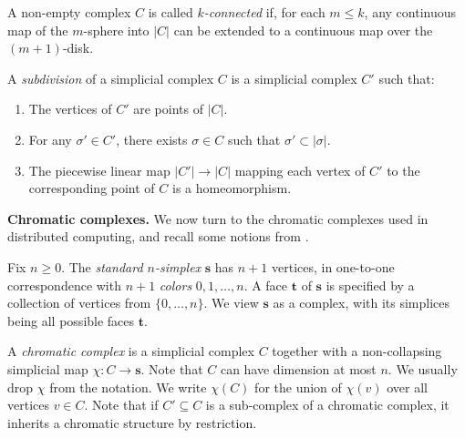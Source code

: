 \documentclass[a4paper]{article}
\newcommand{\myparagraph}[1]{\vspace{6pt}\noindent \textbf{#1}}
\def\s {\mathbf{s}}
\def\t {\mathbf{t}}
\def\Bary{\operatorname{Bary}}
\begin{document}

A non-empty complex $C$ is called {\em $k$-connected} if, for each $m\leq k$, any continuous map of the
$m$-sphere into $|C|$ can be extended to a continuous map over the $(m+1)$-disk.

A {\em subdivision} of a simplicial complex $C$ is a simplicial complex $C'$ such that:
\begin{enumerate}
\item The vertices of $C'$ are points of $|C|$.

\item For any $\sigma' \in C'$, there exists $\sigma \in C$ such that $\sigma' \subset |\sigma|$.

\item The piecewise linear map $|C'| \to |C|$ mapping each vertex of $C'$ to the corresponding point of $C$ is a
homeomorphism.
\end{enumerate}



\myparagraph{Chromatic complexes.}
%
We now turn to the chromatic complexes used in distributed computing, and recall some notions from \cite{HS99}.

Fix $n \geq 0$. The {\em standard $n$-simplex} $\s$ has $n+1$ vertices, in one-to-one correspondence with $n+1$
{\em colors} $0, 1, \dots, n$. A face $\t$ of $\s$ is specified by a collection of vertices from $\{0, \dots,
n\}$. We view $\s$ as a complex, with its simplices being all possible faces $\t$.

A {\em chromatic complex} is a simplicial complex $C$ together with a non-collapsing simplicial map $\chi: C \to
\s$. Note that $C$ can have dimension at most $n$. We usually drop $\chi$ from the notation. We write $\chi(C)$
for the union of $\chi(v)$ over all vertices $v \in C$. Note that if $C' \subseteq C$ is a sub-complex of a
chromatic complex, it inherits a chromatic structure by restriction.
\end{document}
